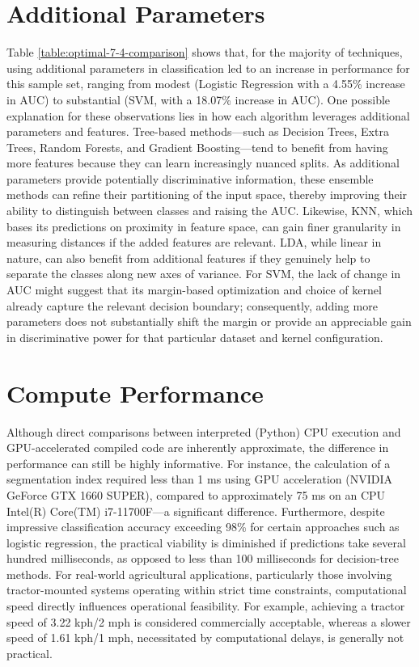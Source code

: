 \documentclass[letterpaper, notitlepage]{report}
\begin{document}
\section{Additional Parameters}
Table \ref{table:optimal-7-4-comparison} shows that, for the majority of techniques, using additional parameters in classification led to an increase in performance for this sample set, ranging from modest (Logistic Regression with a 4.55\% increase in AUC) to substantial (SVM, with a 18.07\% increase in AUC). One possible explanation for these observations lies in how each algorithm leverages additional parameters and features. Tree-based methods—such as Decision Trees, Extra Trees, Random Forests, and Gradient Boosting—tend to benefit from having more features because they can learn increasingly nuanced splits. As additional parameters provide potentially discriminative information, these ensemble methods can refine their partitioning of the input space, thereby improving their ability to distinguish between classes and raising the AUC. Likewise, \gls{KNN}, which bases its predictions on proximity in feature space, can gain finer granularity in measuring distances if the added features are relevant. \gls{LDA}, while linear in nature, can also benefit from additional features if they genuinely help to separate the classes along new axes of variance. For \gls{SVM}, the lack of change in AUC might suggest that its margin-based optimization and choice of kernel already capture the relevant decision boundary; consequently, adding more parameters does not substantially shift the margin or provide an appreciable gain in discriminative power for that particular dataset and kernel configuration.




\section{Compute Performance}
\label{section:compute}
Although direct comparisons between interpreted (Python) CPU execution and GPU-accelerated compiled code are inherently approximate, the difference in performance can still be highly informative. For instance, the calculation of a segmentation index required less than 1 ms using GPU acceleration (NVIDIA GeForce GTX 1660 SUPER), compared to approximately 75 ms on an CPU Intel(R) Core(TM) i7-11700F—a significant difference. Furthermore, despite impressive classification accuracy exceeding 98\% for certain approaches such as logistic regression, the practical viability is diminished if predictions take several hundred milliseconds, as opposed to less than 100 milliseconds for decision-tree methods. For real-world agricultural applications, particularly those involving tractor-mounted systems operating within strict time constraints, computational speed directly influences operational feasibility. For example, achieving a tractor speed of 3.22 kph/2 mph is considered commercially acceptable, whereas a slower speed of 1.61 kph/1 mph, necessitated by computational delays, is generally not practical.
\end{document}
